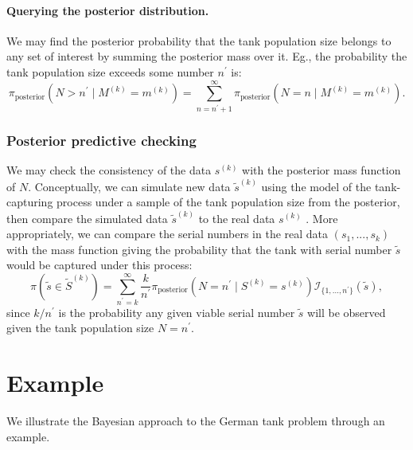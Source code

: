 \documentclass[11pt, oneside]{article}
\newcommand{\data}{$(s_1, ..., s_k)$\xspace}
\begin{document}
\paragraph{Querying the posterior distribution.} We may find the posterior probability that the tank population size belongs to any set of interest by summing the posterior mass over it. Eg., the probability the tank population size exceeds some number $n^\prime$ is:
\begin{equation}
	\pi_{\text{posterior}}(N> n^\prime \mid M^{(k)}=m^{(k)}) = \sum_{n=n^\prime+1}^\infty \pi_{\text{posterior}}(N=n \mid M^{(k)}=m^{(k)}).
\end{equation}

\subsubsection{Posterior predictive checking}
We may check the consistency of the data $s^{(k)}$ with the posterior mass function of $N$.
Conceptually, we can simulate new data $\tilde{s}^{(k)}$ using the model of the tank-capturing process under a sample of the tank population size from the posterior, then compare the simulated data $\tilde{s}^{(k)}$ to the real data $s^{(k)}$ \cite{https://doi.org/10.1111/rssa.12378,van2021bayesian}. 
More appropriately, we can compare the serial numbers in the real data \data with the mass function giving the probability that the tank with serial number $\tilde{s}$ would be captured under this process:
\begin{equation}
	\pi(\tilde{s} \in \tilde{S}^{(k)}) = \sum_{n^\prime=k}^\infty \frac{k}{n^\prime}\pi_{\text{posterior}}(N = n^\prime \mid S^{(k)}=s^{(k)}) \mathcal{I}_{\{1,...,n^\prime\}}(\tilde{s}), \label{eq:posterior_check}
\end{equation} since $k/n^\prime$ is the probability any given viable serial number $\tilde{s}$ will be observed given the tank population size $N=n^\prime$.




\section{Example}
We illustrate the Bayesian approach to the German tank problem through an example.
\end{document}
